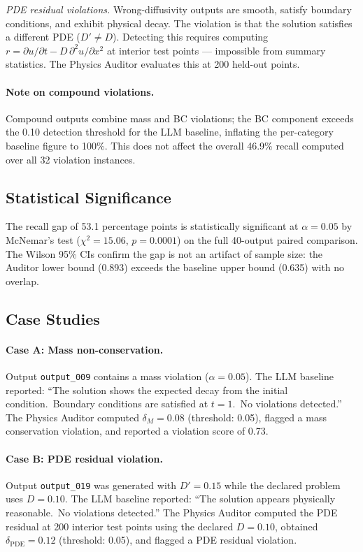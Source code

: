 \documentclass{article}
\begin{document}
\emph{PDE residual violations.}
Wrong-diffusivity outputs are smooth, satisfy boundary conditions, and exhibit
physical decay.
The violation is that the solution satisfies a different PDE ($D' \neq D$).
Detecting this requires computing
$r = \partial u/\partial t - D\,\partial^2 u/\partial x^2$
at interior test points --- impossible from summary statistics.
The Physics Auditor evaluates this at 200 held-out points.

\paragraph{Note on compound violations.}
Compound outputs combine mass and BC violations; the BC component exceeds the
0.10 detection threshold for the LLM baseline, inflating the per-category
baseline figure to 100\%.
This does not affect the overall 46.9\% recall computed over all 32 violation
instances.

\subsection{Statistical Significance}

The recall gap of 53.1 percentage points is statistically significant at
$\alpha=0.05$ by McNemar's test ($\chi^2=15.06$, $p=0.0001$) on the full
40-output paired comparison.
The Wilson 95\% CIs confirm the gap is not an artifact of sample size:
the Auditor lower bound (0.893) exceeds the baseline upper bound (0.635)
with no overlap.

\subsection{Case Studies}

\paragraph{Case A: Mass non-conservation.}
Output \texttt{output\_009} contains a mass violation ($\alpha=0.05$).
The LLM baseline reported: ``The solution shows the expected decay from the
initial condition.~Boundary conditions are satisfied at $t=1$.~No violations
detected.''
The Physics Auditor computed $\delta_M = 0.08$ (threshold: 0.05), flagged a
mass conservation violation, and reported a violation score of 0.73.

\paragraph{Case B: PDE residual violation.}
Output \texttt{output\_019} was generated with $D'=0.15$ while the declared
problem uses $D=0.10$.
The LLM baseline reported: ``The solution appears physically reasonable.~No
violations detected.''
The Physics Auditor computed the PDE residual at 200 interior test points
using the declared $D=0.10$, obtained $\delta_\text{PDE} = 0.12$ (threshold:
0.05), and flagged a PDE residual violation.
\end{document}
